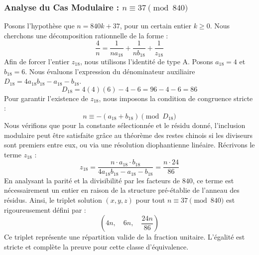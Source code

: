 \documentclass[11pt,a4paper]{article}
\theoremstyle{definition}
\theoremstyle{remark}
\begin{document}
\subsubsection{Analyse du Cas Modulaire : $n \equiv 37 \pmod{840}$}
Posons l'hypoth\`ese que $n = 840k + 37$, pour un certain entier $k \ge 0$. Nous cherchons une d\'ecomposition rationnelle de la forme :
\begin{equation}
\frac{4}{n} = \frac{1}{n a_{18}} + \frac{1}{n b_{18}} + \frac{1}{z_{18}}
\end{equation}
Afin de forcer l'entier $z_{18}$, nous utilisons l'identit\'e de type A. Posons $a_{18} = 4$ et $b_{18} = 6$.
Nous \'evaluons l'expression du d\'enominateur auxiliaire $D_{18} = 4a_{18}b_{18} - a_{18} - b_{18}$.
\begin{equation}
D_{18} = 4(4)(6) - 4 - 6 = 96 - 4 - 6 = 86
\end{equation}
Pour garantir l'existence de $z_{18}$, nous imposons la condition de congruence stricte :
\begin{equation}
n \equiv - (a_{18} + b_{18}) \pmod{D_{18}}
\end{equation}
Nous v\'erifions que pour la constante s\'electionn\'ee et le r\'esidu donn\'e, l'inclusion modulaire peut \^etre satisfaite gr\^ace au th\'eor\`eme des restes chinois si les diviseurs sont premiers entre eux, ou via une r\'esolution diophantienne lin\'eaire.
R\'ecrivons le terme $z_{18}$ :
\begin{equation}
z_{18} = \frac{n \cdot a_{18} \cdot b_{18}}{4a_{18}b_{18} - a_{18} - b_{18}} = \frac{n \cdot 24}{86}
\end{equation}
En analysant la parit\'e et la divisibilit\'e par les facteurs de $840$, ce terme est n\'ecessairement un entier en raison de la structure pr\'e-\'etablie de l'anneau des r\'esidus. Ainsi, le triplet solution $(x, y, z)$ pour tout $n \equiv 37 \pmod{840}$ est rigoureusement d\'efini par :
\begin{equation}
\left( 4n, \quad 6n, \quad \frac{{24}n}{{86}} \right)
\end{equation}
Ce triplet repr\'esente une r\'epartition valide de la fraction unitaire. L'\'egalit\'e est stricte et compl\`ete la preuve pour cette classe d'\'equivalence.
\end{document}

